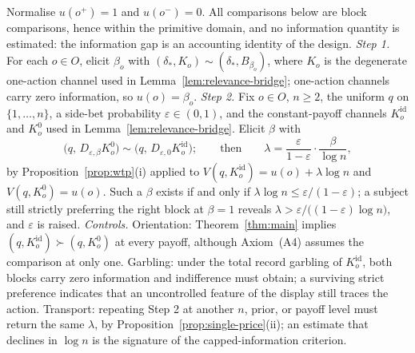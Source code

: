 \begin{remark}\label{rem:elicitation}
Normalise $u(o^+)=1$ and $u(o^-)=0$.  All comparisons below are block comparisons, hence within the primitive
domain, and no information quantity is estimated: the information gap is an accounting identity of the design.
\emph{Step 1.}  For each $o\in O$, elicit $\beta_o$ with $(\delta_\ast,K_o)\sim(\delta_\ast,B_{\beta_o})$, where
$K_o$ is the degenerate one-action channel used in Lemma~\ref{lem:relevance-bridge}; one-action channels carry zero information, so
$u(o)=\beta_o$.
\emph{Step 2.}  Fix $o\in O$, $n\ge2$, the uniform $q$ on $\{1,\dots,n\}$, a side-bet probability $\varepsilon\in(0,1)$, and
the constant-payoff channels $K^{\mathrm{id}}_o$ and $K^0_o$ used in Lemma~\ref{lem:relevance-bridge}.  Elicit $\beta$ with
\[
 \bigl(q,\,D_{\varepsilon,\beta}K^{0}_o\bigr)\sim\bigl(q,\,D_{\varepsilon,0}K^{\mathrm{id}}_o\bigr);
 \qquad\text{then}\qquad
 \lambda=\frac{\varepsilon}{1-\varepsilon}\cdot\frac{\beta}{\log n},
\]
by Proposition~\ref{prop:wtp}\textup{(i)} applied to $V(q,K^{\mathrm{id}}_o)=u(o)+\lambda\log n$ and
$V(q,K^{0}_o)=u(o)$.  Such a $\beta$ exists if and only if $\lambda\log n\le\varepsilon/(1-\varepsilon)$; a
subject still strictly preferring the right block at $\beta=1$ reveals
$\lambda>\varepsilon/\bigl((1-\varepsilon)\log n\bigr)$, and $\varepsilon$ is raised.
\emph{Controls.}  Orientation: Theorem~\ref{thm:main} implies
$(q,K^{\mathrm{id}}_o)\succ(q,K^{0}_o)$ at every payoff, although Axiom~\textup{(A4)} assumes the comparison at only one.  Garbling:
under the total record garbling of $K^{\mathrm{id}}_o$, both blocks carry zero information and indifference must
obtain; a surviving strict preference indicates that an uncontrolled feature of the display still traces the
action.  Transport: repeating Step 2 at another $n$, prior, or payoff level must return the same $\lambda$, by
Proposition~\ref{prop:single-price}\textup{(ii)}; an estimate that declines in $\log n$ is the signature of the
capped-information criterion.
\end{remark}
